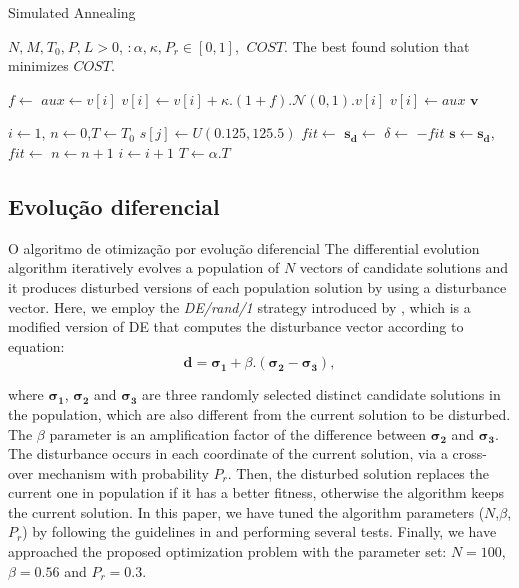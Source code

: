 \begin{algorithm}[ht]
\caption{Simulated Annealing}
\label{alg:sa}
\begin{algorithmic}
\Require $N\text{,}\:M\text{,}\:T_0\text{,}\:P\text{,}\:L> 0$, $:\alpha\text{,}\:\kappa\text{,}\:P_r \in [0,1]$, $\:COST$.
\Ensure The best found solution that minimizes $COST$.

\State $f \gets$ 
\State $aux \gets v[i]$
\State $v[i] \gets v[i]+ \kappa.(1+f).\mathcal{N}(0,1).v[i]$
\State $v[i] \gets aux$
\EndIf
\EndIf
\EndFor
\State \Return $\boldsymbol{v}$
\EndFunction

\State $i \gets 1$, $n \gets 0$,$T \gets T_0$
\State $s[j] \gets U(0.125,125.5)$
\EndFor
\State $fit \gets$  
\Repeat
\State $\boldsymbol{s_d} \gets$ 
\State $\delta \gets$ $- fit$ 
\State $\boldsymbol{s} \gets \boldsymbol{s_d}$,$fit \gets $ 
$n \gets n + 1$
\EndIf
\State $i \gets i + 1$
\State $T \gets \alpha.T$
\end{algorithmic}
\end{algorithm}

\subsection{Evolução diferencial}

O algoritmo de otimização por evolução diferencial 
The differential evolution algorithm iteratively evolves a population of $N$ vectors of candidate solutions and it produces disturbed versions of each population solution by using a disturbance vector. Here, we employ the  \emph{DE/rand/1} strategy introduced by \cite{Storn:1996},  which is a modified version of DE that computes the disturbance vector according to equation:
\begin{equation}
\boldsymbol{d} = \boldsymbol{\sigma_1} + \beta.(\boldsymbol{\sigma_2} - \boldsymbol{\sigma_3}),
\end{equation}

\noindent where $\boldsymbol{\sigma_1}$, $\boldsymbol{\sigma_2}$ and $\boldsymbol{\sigma_3}$ are three randomly selected distinct candidate solutions in the population, which are also different from the current solution to be disturbed.  The $\beta$ parameter is an amplification factor of the difference between $\boldsymbol{\sigma_2}$ and $\boldsymbol{\sigma_3}$. The disturbance occurs in each coordinate of the current solution, via a cross-over mechanism with probability $P_r$. Then, the disturbed solution replaces the current one in population if it has a better fitness, otherwise the algorithm keeps the current solution. 
In this paper, we have tuned the algorithm parameters ($N$,$\beta$,$P_r$) by following the guidelines in \cite{Storn:1996} and performing several tests. Finally,  we have approached the proposed optimization problem with the  parameter set: $N = 100$, $\beta = 0.56$ and $P_r = 0.3$.

